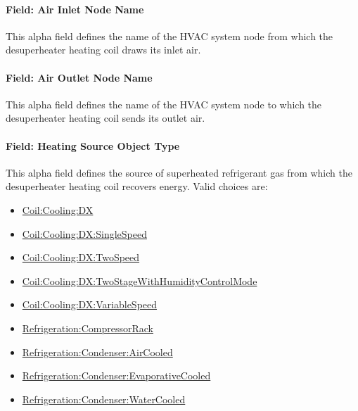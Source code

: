 \paragraph{Field: Air Inlet Node Name}\label{field-air-inlet-node-name-5-000}

This alpha field defines the name of the HVAC system node from which the desuperheater heating coil draws its inlet air.

\paragraph{Field: Air Outlet Node Name}\label{field-air-outlet-node-name-5-000}

This alpha field defines the name of the HVAC system node to which the desuperheater heating coil sends its outlet air.

\paragraph{Field: Heating Source Object Type}\label{field-heating-source-object-type}

This alpha field defines the source of superheated refrigerant gas from which the desuperheater heating coil recovers energy. Valid choices are:

\begin{itemize}
\item
  \hyperref[coilcoolingdx]{Coil:Cooling:DX}
\item
  \hyperref[coilcoolingdxsinglespeed]{Coil:Cooling:DX:SingleSpeed}
\item
  \hyperref[coilcoolingdxtwospeed]{Coil:Cooling:DX:TwoSpeed}
\item
  \hyperref[coilcoolingdxtwostagewithhumiditycontrolmode]{Coil:Cooling:DX:TwoStageWithHumidityControlMode}
\item
  \hyperref[coilcoolingdxvariablespeed]{Coil:Cooling:DX:VariableSpeed}
\item
  \hyperref[refrigerationcompressorrack]{Refrigeration:CompressorRack}
\item
  \hyperref[refrigerationcondenseraircooled]{Refrigeration:Condenser:AirCooled}
\item
  \hyperref[refrigerationcondenserevaporativecooled]{Refrigeration:Condenser:EvaporativeCooled}
\item
  \hyperref[refrigerationcondenserwatercooled]{Refrigeration:Condenser:WaterCooled}
\end{itemize}

